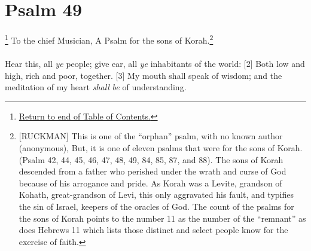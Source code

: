 \chapter{Psalm 49}
\footnote{\textcolor[rgb]{0.00,0.25,0.00}{\hyperlink{TOC}{Return to end of Table of Contents.}}}
\textcolor[rgb]{0.00,0.00,1.00}{To the chief Musician, A Psalm for the sons of Korah.}\footnote{[RUCKMAN] This is one of the ``orphan'' psalm, with no known author (anonymous), But, it is one of eleven psalms that were for the sons of Korah. (Psalm 42, 44, 45, 46, 47, 48, 49, 84, 85, 87, and 88). The sons of Korah descended from a father who perished under the wrath and curse of God because of his arrogance and pride.   As Korah was a Levite, grandson of Kohath, great-grandson of Levi, this only aggravated his fault, and typifies the sin of Israel, keepers of the oracles of God. \cite{Phillips2001PsalmsV1} The count of the psalms for the sons of Korah points to the number 11 as the number of the ``remnant'' as does Hebrews 11 which lists those distinct and select people know for the exercise of faith.}\\
\\
\textcolor[rgb]{0.00,0.00,1.00}{Hear this, all \emph{ye} people; give ear, all \emph{ye} inhabitants of the world:}
[2] \textcolor[rgb]{0.00,0.00,1.00}{Both low and high, rich and poor, together.}
[3] \textcolor[rgb]{0.00,0.00,1.00}{My mouth shall speak of wisdom; and the meditation of my heart \emph{shall} \emph{be} of understanding.}
